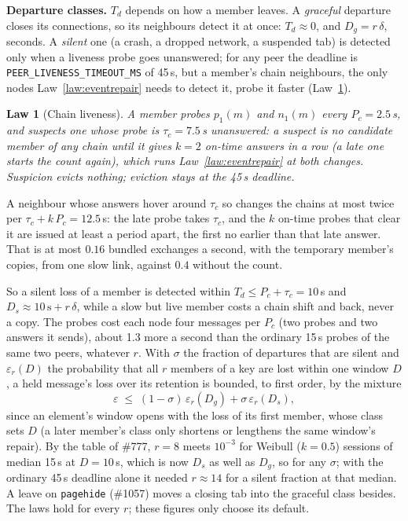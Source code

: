 \documentclass[journal]{IEEEtran}
\newtheorem{law}{Law}
\newcommand{\issue}[1]{\#{#1}}
\newcommand{\jsq}[1]{\texttt{#1}}
\begin{document}
\textbf{Departure classes.}  $T_d$ depends on how a member leaves.  A \emph{graceful} departure
closes its connections, so its neighbours detect it at once: $T_d\approx0$, and
$D_g=r\,\delta$, seconds.  A \emph{silent} one (a crash, a dropped network, a suspended tab)
is detected only when a liveness probe goes unanswered; for any peer the deadline is
\texttt{PEER\_LIVENESS\_TIMEOUT\_MS} of 45\,s, but a member's chain neighbours, the only nodes
Law~\ref{law:eventrepair} needs to detect it, probe it faster (Law~\ref{law:chainliveness}).

\begin{law}[Chain liveness]\label{law:chainliveness}
A member probes $p_1(m)$ and $n_1(m)$ every $P_c=2.5$\,s, and suspects one whose probe is
$\tau_c=7.5$\,s unanswered: a suspect is no candidate member of any chain until it gives
$k=2$ on-time answers in a row (a late one starts the count again), which runs
Law~\ref{law:eventrepair} at both changes.  Suspicion evicts nothing; eviction stays at the
45\,s deadline.
\end{law}

A neighbour whose answers hover around $\tau_c$ so changes the chains at most twice per
$\tau_c+k\,P_c=12.5$\,s: the late probe takes $\tau_c$, and the $k$ on-time probes that clear it
are issued at least a period apart, the first no earlier than that late answer.  That is at most
$0.16$ bundled exchanges a second, with the temporary member's copies, from one slow link,
against $0.4$ without the count.

So a silent loss of a member is detected within $T_d\le P_c+\tau_c=10$\,s and
$D_s\approx10\,\mathrm{s}+r\,\delta$, while a slow but live member costs a chain shift and back,
never a copy.  The probes cost each node four messages per $P_c$ (two probes and two answers it
sends), about 1.3 more a second than the ordinary 15\,s probes of the same two peers, whatever
$r$.  With $\sigma$ the fraction of
departures that are silent and $\varepsilon_r(D)$ the probability that all $r$ members of a key
are lost within one window $D$, a held message's loss over its retention is bounded, to first
order, by the mixture
\[
\varepsilon\;\le\;(1-\sigma)\,\varepsilon_r(D_g)+\sigma\,\varepsilon_r(D_s),
\]
since an element's window opens with the loss of its first member, whose class sets $D$ (a
later member's class only shortens or lengthens the same window's repair).  By
the table of \issue{777}, $r=8$ meets $10^{-3}$ for Weibull ($k=0.5$) sessions of median
15\,s at $D=10$\,s, which is now $D_s$ as well as $D_g$, so for any $\sigma$; with the ordinary
45\,s deadline alone it needed $r\approx14$ for a silent fraction at that median.  A leave on
\jsq{pagehide} (\issue{1057}) moves a closing tab into the graceful class besides.  The laws hold
for every $r$; these figures only choose its default.
\end{document}
